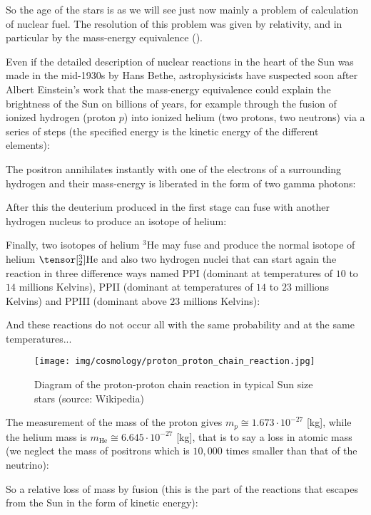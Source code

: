 	So the age of the stars is as we will see just now mainly a problem of calculation of nuclear fuel. The resolution of this problem was given by relativity, and in particular by the mass-energy equivalence ().

	Even if the detailed description of nuclear reactions in the heart of the Sun was made in the mid-1930s by Hans Bethe, astrophysicists have suspected soon after Albert Einstein's work that the mass-energy equivalence could explain the brightness of the Sun on billions of years, for example through the fusion of ionized hydrogen (proton $p$) into ionized helium (two protons, two neutrons) via a series of steps (the specified energy is the kinetic energy of the different elements):
	
	The positron annihilates instantly with one of the electrons of a surrounding hydrogen and their mass-energy is liberated in the form of two gamma photons:
	
	After this the deuterium produced in the first stage can fuse with another hydrogen nucleus to produce an isotope of helium:
	
	Finally, two isotopes of helium $^3\mathrm{He}$  may fuse and produce the normal isotope of helium $\tensor[^{3}_2]{\mathrm{He}}{}$ and also two hydrogen nuclei that can start again the reaction in three difference ways named PPI (dominant at temperatures of $10$ to $14$ millions Kelvins), PPII (dominant at temperatures of $14$ to $23$ millions Kelvins) and PPIII (dominant above $23$ millions Kelvins):
	
	And these reactions do not occur all with the same probability and at the same temperatures...
	\begin{figure}[H]
		\centering
		\texttt{[image: img/cosmology/proton\_proton\_chain\_reaction.jpg]}	
		\caption[Diagram of the proton-proton chain reaction in typical Sun size stars]{Diagram of the proton-proton chain reaction in typical Sun size stars (source: Wikipedia)}
	\end{figure}
	The measurement of the mass of the proton gives $m_p\cong 1.673\cdot 10^{-27}$ [kg], while the helium mass is   $m_{\text{He}}\cong 6.645\cdot 10^{-27}$ [kg], that is to say a loss in atomic mass (we neglect the mass of positrons which is $10,000$ times smaller than that of the neutrino):
	
	So a relative loss of mass by fusion (this is the part of the reactions that escapes from the Sun in the form of kinetic energy):
	
